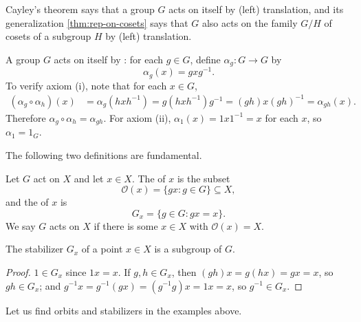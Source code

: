 Cayley's theorem says that a group \(G\) acts on itself by (left) translation, and its
generalization \autoref{thm:rep-on-cosets} says that \(G\) also acts on the family
\(G/H\) of cosets of a subgroup \(H\) by (left) translation.

\begin{eg}[Conjugation]\label{eg:conjugation-action}
	A group \(G\) acts on itself by : for each \(g \in G\), define
	\(\alpha_g\colon G \to G\) by
	\[
		\alpha_g(x) = gxg^{-1}.
	\]
	To verify axiom (i), note that for each \(x \in G\),
	\begin{align*}
		(\alpha_g \circ \alpha_h)(x)
		 & = \alpha_g(hxh^{-1})
		= g(hxh^{-1})g^{-1}
		= (gh)x(gh)^{-1}
		= \alpha_{gh}(x).
	\end{align*}
	Therefore \(\alpha_g \circ \alpha_h = \alpha_{gh}\). For axiom (ii),
	\(\alpha_1(x) = 1x1^{-1} = x\) for each \(x\), so \(\alpha_1 = 1_G\).
\end{eg}

The following two definitions are fundamental.

\begin{definition}\label{def:orbit-stabilizer}
	Let \(G\) act on \(X\) and let \(x \in X\). The  of \(x\) is the subset
	\[
		\mathcal O(x) = \{gx : g \in G\} \subseteq X,
	\]
	and the  of \(x\) is
	\[
		G_x = \{g \in G : gx = x\}.
	\]
	We say \(G\) acts  on \(X\) if there is some \(x \in X\) with
	\(\mathcal O(x) = X\).
\end{definition}

\begin{lemma}\label{lem:stabilizer-subgroup}
	The stabilizer \(G_x\) of a point \(x \in X\) is a subgroup of \(G\).
\end{lemma}

\begin{proof}
	\(1 \in G_x\) since \(1x = x\). If \(g, h \in G_x\), then \((gh)x = g(hx) = gx = x\),
	so \(gh \in G_x\); and \(g^{-1}x = g^{-1}(gx) = (g^{-1}g)x = 1x = x\), so
	\(g^{-1} \in G_x\).
\end{proof}

Let us find orbits and stabilizers in the examples above.

